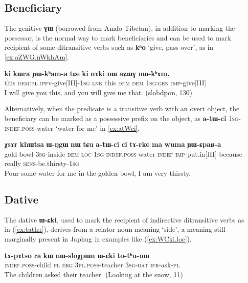 \documentclass[oldfontcommands,oneside,a4paper,11pt]{article}
\newcommand{\ipa}[1]{\mbox{\phon\textbf{#1}}} %
\begin{document}
 

 
 \subsection{Beneficiary}  \label{sec:benef}
The genitive \ipa{ɣɯ} (borrowed from Amdo Tibetan), in addition to marking the possessor, is the normal way to mark beneficiaries and can be used to mark recipient of some ditransitive verbs such as \ipa{kʰo} `give, pass over', as in \ref{ex:aZWG.nWkhAm}.

\begin{exe}
\ex \label{ex:aZWG.nWkhAm}
\gll
\ipa{ki} 	\ipa{kɯra} 	\ipa{ɲɯ-kʰam-a} 	\ipa{tɕe} 	\ipa{ki} 	\ipa{nɤki} 	\ipa{nɯ} 	\ipa{aʑɯɣ} 	\ipa{nɯ-kʰɤm.} \\
this \textsc{dem:pl} \textsc{ipfv}-give[III]-\textsc{1sg} \textsc{lnk} this \textsc{dem} \textsc{dem} \textsc{1sg:gen} \textsc{imp}-give[III] \\
\glt I will give you this, and you will give me that. (slobdpon, 130)
\end{exe}

Alternatively, when the predicate is a transitive verb with an overt object, the beneficiary can be marked as a possessive prefix on the object, as 	\ipa{a-tɯ-ci} \textsc{1sg-indef.poss}-water `water for me' in \ref{ex:atWci}.

\begin{exe}
\ex \label{ex:atWci}
\gll \ipa{χsɤr}  	\ipa{khɯtsa}  	\ipa{ɯ-ŋgɯ}  	\ipa{nɯ}  	\ipa{tɕu}  	\ipa{a-tɯ-ci}  	\ipa{ci}  	\ipa{tɤ-rke}  	\ipa{ma}  	\ipa{wuma}  	\ipa{ɲɯ-ɕpaʁ-a}  \\
gold bowl \textsc{3sg}-inside \textsc{dem} \textsc{loc} \textsc{1sg-indef.poss}-water \textsc{indef} \textsc{imp}-put.in[III] because really \textsc{sens}-be.thirsty-\textsc{1sg} \\
\glt Pour some water for me in the golden bowl, I am very thirsty.
\end{exe}

\subsection{Dative}  \label{sec:dat}
The dative \ipa{ɯ-ɕki}, used to mark the recipient of indirective ditransitive verbs as in (\ref{ex:tathu}), derives from a relator noun  meaning `side', a meaning still marginally present in Japhug in examples like (\ref{ex:WCki.loc}).

 \begin{exe}
   \ex   \label{ex:tathu}
 \gll \ipa{tɤ-pɤtso}  	\ipa{ra}  	\ipa{kɯ}  	\ipa{nɯ-sloχpɯn}  	\ipa{ɯ-ɕki}  	\ipa{to-tʰu-nɯ}  \\
\textsc{indef.poss}-child \textsc{pl} \textsc{erg} \textsc{3pl.poss}-teacher \textsc{3sg-dat} \textsc{ifr}-ask-\textsc{pl} \\
\glt The children asked their teacher. (Looking at the snow, 11)
   \end{exe}  
\end{document}
